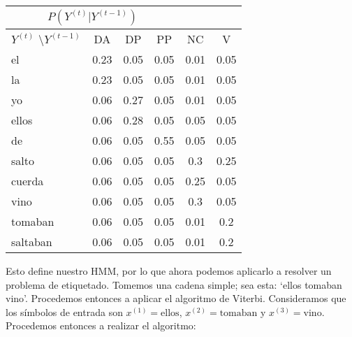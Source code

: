 \begin{center}
 \begin{tabular}{l|ccccc}
  \multicolumn{4}{c}{$P(Y^{(t)}|Y^{(t-1)})$} \\ \hline
  $Y^{(t)}$ \textbackslash $Y^{(t-1)}$          & DA & DP & PP & NC & V \\ \hline
  el        & 0.23  & 0.05  & 0.05 & 0.01   & 0.05  \\
  la        & 0.23  & 0.05  & 0.05 & 0.01    & 0.05 \\
  yo        & 0.06  & 0.27  & 0.05 & 0.01    & 0.05  \\
  ellos     & 0.06  & 0.28  & 0.05 & 0.05 & 0.05 \\
  de        & 0.06  & 0.05  & 0.55 & 0.05 & 0.05 \\
  salto     & 0.06  & 0.05  & 0.05   & 0.3  & 0.25 \\
  cuerda    & 0.06  & 0.05  & 0.05  & 0.25  & 0.05 \\
  vino      & 0.06  & 0.05  & 0.05   & 0.3  & 0.05 \\
  tomaban   & 0.06  & 0.05  & 0.05   & 0.01    & 0.2 \\
  saltaban  & 0.06  & 0.05  & 0.05   & 0.01    & 0.2 \\
 \end{tabular}
 \end{center}


 Esto define nuestro HMM, por lo que ahora podemos aplicarlo a resolver un problema de etiquetado. Tomemos una cadena simple; sea esta: `ellos tomaban vino'. Procedemos entonces a aplicar el algoritmo de Viterbi. Consideramos que los símbolos de entrada son $x^{(1)} = \text{ellos}$, $x^{(2)} = \text{tomaban}$ y $x^{(3)} = \text{vino}$. Procedemos entonces a realizar el algoritmo:

